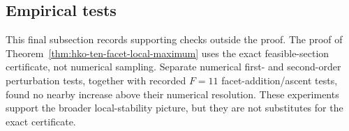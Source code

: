 \subsection{Empirical tests}
\label{subsec:hko-local-maximum-empirical-tests}

This final subsection records supporting checks outside the proof. The
proof of Theorem~\ref{thm:hko-ten-facet-local-maximum} uses the exact
feasible-section certificate, not numerical sampling. Separate numerical
first- and second-order perturbation tests, together with recorded \(F=11\)
facet-addition/ascent tests, found no nearby increase above their numerical
resolution. These experiments support the broader local-stability picture, but
they are not substitutes for the exact certificate.
